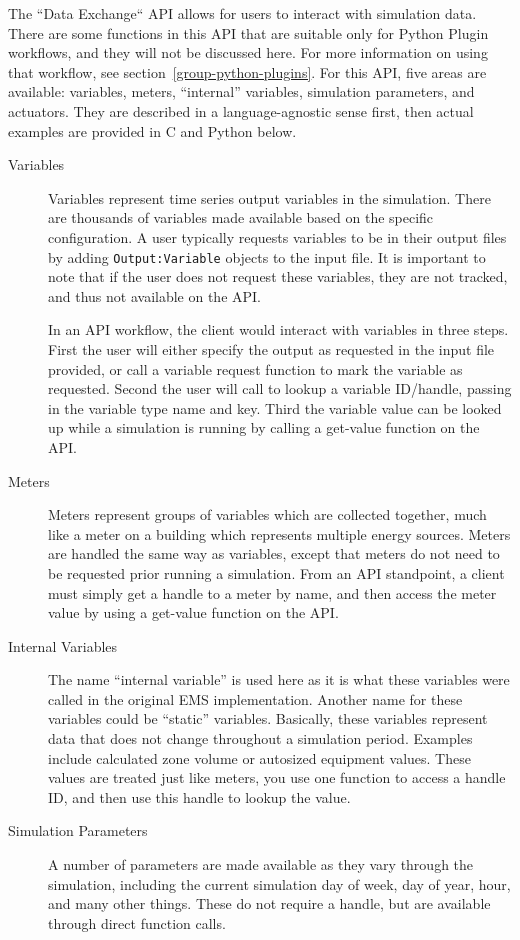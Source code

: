 The ``Data Exchange`` API allows for users to interact with simulation data.
There are some functions in this API that are suitable only for Python Plugin workflows, and they will not be discussed here.
For more information on using that workflow, see section~\ref{group-python-plugins}.
For this API, five areas are available: variables, meters, ``internal'' variables, simulation parameters, and actuators.
They are described in a language-agnostic sense first, then actual examples are provided in C and Python below.
\begin{description}
 \item[Variables] Variables represent time series output variables in the simulation.
                  There are thousands of variables made available based on the specific configuration.
                  A user typically requests variables to be in their output files by adding \verb=Output:Variable= objects to the input file.
                  It is important to note that if the user does not request these variables, they are not tracked, and thus not available on the API.

                  In an API workflow, the client would interact with variables in three steps.
                  First the user will either specify the output as requested in the input file provided, or call a variable request function to mark the variable as requested.
                  Second the user will call to lookup a variable ID/handle, passing in the variable type name and key.
                  Third the variable value can be looked up while a simulation is running by calling a get-value function on the API.
 \item[Meters] Meters represent groups of variables which are collected together, much like a meter on a building which represents multiple energy sources.
               Meters are handled the same way as variables, except that meters do not need to be requested prior running a simulation.
               From an API standpoint, a client must simply get a handle to a meter by name, and then access the meter value by using a get-value function on the API.
 \item[Internal Variables] The name ``internal variable'' is used here as it is what these variables were called in the original EMS implementation.
                           Another name for these variables could be ``static'' variables.
                           Basically, these variables represent data that does not change throughout a simulation period.
                           Examples include calculated zone volume or autosized equipment values.
                           These values are treated just like meters, you use one function to access a handle ID, and then use this handle to lookup the value.
 \item[Simulation Parameters] A number of parameters are made available as they vary through the simulation, including the current simulation day of week, day of year, hour, and many other things.
                              These do not require a handle, but are available through direct function calls.
\end{description}

